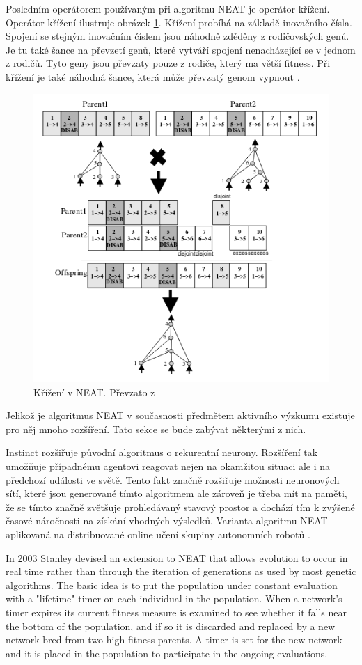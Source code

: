 Posledním operátorem používaným při algoritmu NEAT je operátor křížení. Operátor křížení ilustruje obrázek \ref{fig:neatcrossover}. Křížení probíhá na základě inovačního čísla. Spojení se stejným inovačním číslem jsou náhodně zděděny z rodičovských genů. Je tu také šance na převzetí genů, které vytváří spojení nenacházející se v jednom z rodičů. Tyto geny jsou převzaty pouze z rodiče, který ma větší fitness. Při křížení je také náhodná šance, která může převzatý genom vypnout \cite[s.~12]{NEAT}.

\begin{figure}[h!]
	\centering
	\includegraphics[width=0.6\linewidth]{neatCrossover}
	\caption{Křížení v NEAT. Převzato z \cite[s.~12]{NEAT}}
	\label{fig:neatcrossover}
\end{figure}

Jelikož je algoritmus NEAT v současnosti předmětem aktivního výzkumu existuje pro něj mnoho rozšíření. Tato sekce se bude zabývat některými z nich.

Instinct rozšiřuje původní algoritmus o rekurentní neurony. Rozšíření tak umožňuje případnému agentovi reagovat nejen na okamžitou situaci ale i na předchozí události ve světě. Tento fakt značně rozšiřuje možnosti neuronových sítí, které jsou generované tímto algoritmem ale zároveň je třeba mít na paměti, že se tímto značně zvětšuje prohledávaný stavový prostor a dochází tím k zvýšené časové náročnosti na získání vhodných výsledků.
Varianta algoritmu NEAT aplikovaná na distribuované online učení skupiny autonomních robotů \cite[s.~1]{odNEAT}.

In 2003 Stanley devised an extension to NEAT that allows evolution to occur in real time rather than through the iteration of generations as used by most genetic algorithms. The basic idea is to put the population under constant evaluation with a "lifetime" timer on each individual in the population. When a network's timer expires its current fitness measure is examined to see whether it falls near the bottom of the population, and if so it is discarded and replaced by a new network bred from two high-fitness parents. A timer is set for the new network and it is placed in the population to participate in the ongoing evaluations.

